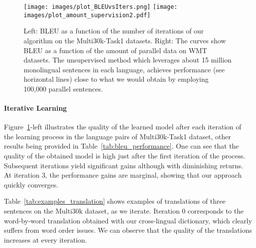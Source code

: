 \begin{figure}[tb]
\begin{center}
\texttt{[image: images/plot\_BLEUvsIters.png]}
\texttt{[image: images/plot\_amount\_supervision2.pdf]}
\end{center}
\caption{Left: BLEU as a function of the number of iterations of our algorithm on the Multi30k-Task1 datasets. Right: The curves show BLEU as a function of the amount of parallel data on WMT datasets. The unsupervised method which leverages about 15 million monolingual sentences in each language, achieves performance (see horizontal lines) close to what we would obtain by employing 100,000 parallel sentences.}
\label{fig:plots}
\end{figure}

\paragraph{Iterative Learning} Figure~\ref{fig:plots}-left illustrates the quality of the learned model after each iteration of the learning process in the language pairs of Multi30k-Task1 dataset, other results being provided in Table~\ref{tab:bleu_performance}. One can see that the quality of the obtained model is high just after the first iteration of the process. Subsequent iterations yield significant gains although with diminishing returns. At iteration 3, the performance gains are marginal, showing that our approach quickly converges.

Table~\ref{tab:examples_translation} shows examples of translations of three sentences on the Multi30k dataset, as we iterate. Iteration 0 corresponds to the word-by-word translation obtained with our cross-lingual dictionary, which clearly suffers from word order issues. We can observe that the quality of the translations increases at every iteration.


